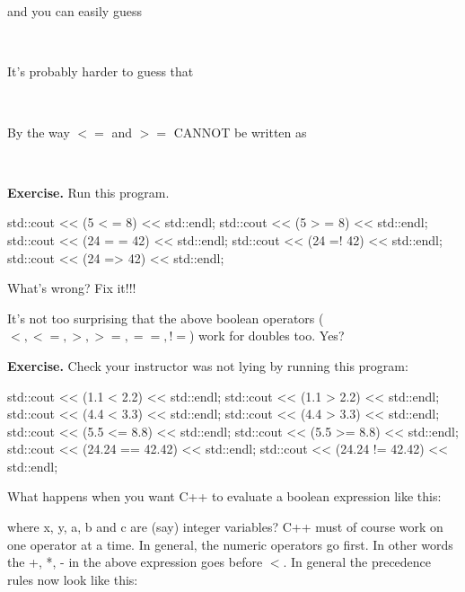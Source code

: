 \\
\\

and you can easily guess

\\

It's probably harder to guess that

\\

By the way $<=$ and $>=$ CANNOT be written as

\\

\textbf{Exercise.} Run this program.
\begin{console}
std::cout << (5 < = 8) << std::endl;
std::cout << (5 > = 8) << std::endl;
std::cout << (24 = = 42) << std::endl;
std::cout << (24 =! 42) << std::endl;
std::cout << (24 => 42) << std::endl;
\end{console}
What's wrong? Fix it!!!


It's not too surprising that the above boolean operators ($<, <=, >, >=, ==, !=$) work for doubles too. Yes?

\textbf{Exercise.} Check your instructor was not lying by running this program:
\begin{console}
std::cout << (1.1 < 2.2) << std::endl;
std::cout << (1.1 > 2.2) << std::endl;
std::cout << (4.4 < 3.3) << std::endl;
std::cout << (4.4 > 3.3) << std::endl;
std::cout << (5.5 <= 8.8) << std::endl;
std::cout << (5.5 >= 8.8) << std::endl;
std::cout << (24.24 == 42.42) << std::endl;
std::cout << (24.24 != 42.42) << std::endl;
\end{console}


What happens when you want C++ to evaluate a boolean expression like
this:

where x, y, a, b and c are (say) integer variables? C++ must of course
work on one operator at a time. In general, the numeric operators go first.
In other words the +, *, - in the above expression goes before $<$.
In general the precedence rules now look like this:

